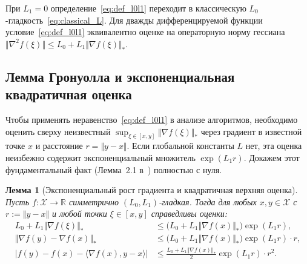 \documentclass[11pt, a4paper]{article}
\newtheorem{lemma}{Лемма}[section]
\theoremstyle{definition}
\begin{document}
При $L_1 = 0$ определение~\eqref{eq:def_l0l1} переходит в классическую $L_0$-гладкость~\eqref{eq:classical_L}. Для дважды дифференцируемой функции условие~\eqref{eq:def_l0l1} эквивалентно оценке на операторную норму гессиана $\Vert \nabla^2 f(\xi) \Vert \le L_0 + L_1 \Vert \nabla f(\xi) \Vert_*$.

\subsection{Лемма Гронуолла и экспоненциальная квадратичная оценка}

Чтобы применять неравенство~\eqref{eq:def_l0l1} в анализе алгоритмов, необходимо оценить сверху неизвестный $\sup_{\xi \in [x, y]} \Vert \nabla f(\xi) \Vert_*$ через градиент в известной точке $x$ и расстояние $r = \Vert y - x \Vert$. Если глобальной константы $L$ нет, эта оценка неизбежно содержит экспоненциальный множитель $\exp(L_1 r)$. Докажем этот фундаментальный факт (Лемма~2.1 в~\cite{Gorbunov2024}) полностью с нуля.

\begin{lemma}[Экспоненциальный рост градиента и квадратичная верхняя оценка]\label{lem:gronwall_l0l1}
Пусть $f : \mathcal{X} \to \mathbb{R}$ симметрично $(L_0, L_1)$-гладкая. Тогда для любых $x, y \in \mathcal{X}$ с $r := \Vert y - x \Vert$ и любой точки $\xi \in [x, y]$ справедливы оценки:
\begin{align}
L_0 + L_1 \Vert \nabla f(\xi) \Vert_* &\le \big(L_0 + L_1 \Vert \nabla f(x) \Vert_*\big) \exp(L_1 r), \label{eq:grad_exp_bound} \\
\Vert \nabla f(y) - \nabla f(x) \Vert_* &\le \big(L_0 + L_1 \Vert \nabla f(x) \Vert_*\big) \exp(L_1 r) \cdot r, \label{eq:grad_diff_exp} \\
\big| f(y) - f(x) - \langle \nabla f(x), y - x \rangle \big| &\le \frac{L_0 + L_1 \Vert \nabla f(x) \Vert_*}{2} \exp(L_1 r) \cdot r^2. \label{eq:quad_upper_exp}
\end{align}
\end{lemma}
\end{document}

